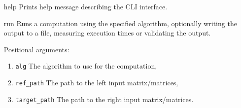 \begin{itemize}
	\item[help] Prints help message describing the CLI interface.
	\item[run] Runs a computation using the specified algorithm, optionally writing the output to a file, measuring execution times or validating the output. 
	
	Positional arguments:
	\begin{enumerate}
		\item \texttt{alg} The algorithm to use for the computation,
		\item \texttt{ref\_path} The path to the left input matrix/matrices,
		\item \texttt{target\_path} The path to the right input matrix/matrices.
	\end{enumerate}


\end{itemize}
